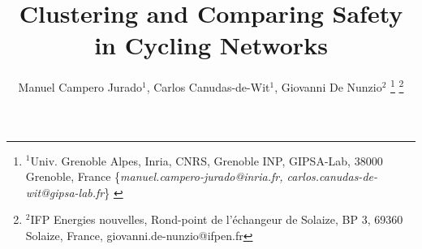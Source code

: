 \documentclass[lettersize,journal]{IEEEtran}
\begin{document}
\title{Clustering and Comparing Safety in Cycling Networks}

\author{Manuel Campero Jurado$^{1}$, Carlos Canudas-de-Wit$^{1}$, Giovanni De Nunzio$^{2}$%
\thanks{$^{1}$Univ. Grenoble Alpes, Inria, CNRS, Grenoble INP, GIPSA-Lab, 38000 Grenoble, France
        {\footnotesize \{\textit{manuel.campero-jurado@inria.fr, carlos.canudas-de-wit@gipsa-lab.fr}\} }}%
\thanks{$^{2}$IFP Energies nouvelles,
Rond-point de l’échangeur de Solaize, BP 3, 69360 Solaize, France,
        {\footnotesize giovanni.de-nunzio@ifpen.fr}}%
}




\maketitle
\end{document}
